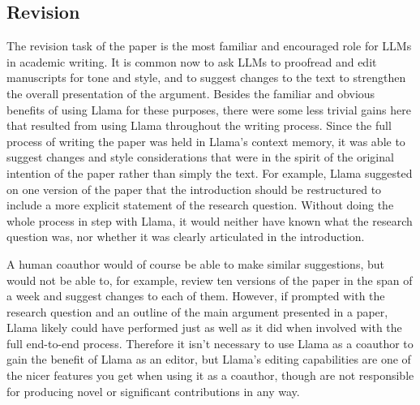 \subsection{Revision}

The revision task of the paper is the most familiar and encouraged role for
LLMs in academic writing. It is common now to ask LLMs to proofread and edit
manuscripts for tone and style, and to suggest changes to the text to strengthen
the overall presentation of the argument. Besides the familiar and obvious
benefits of using Llama for these purposes, there were some less trivial gains
here that resulted from using Llama throughout the writing process. Since
the full process of writing the paper was held in Llama's context memory, it was
able to suggest changes and style considerations that were in the spirit of the
original intention of the paper rather than simply the text. For example, Llama 
suggested on one version of the paper that the introduction should be
restructured to include a more explicit statement of the research question.
Without doing the whole process in step with Llama, it would neither have known
what the research question was, nor whether it was clearly articulated in the
introduction.

A human coauthor would of course be able to make similar suggestions, but would
not be able to, for example, review ten versions of the paper in the span of a
week and suggest changes to each of them. However, if prompted with the research
question and an outline of the main argument presented in a paper, Llama likely
could have performed just as well as it did when involved with the full
end-to-end process. Therefore it isn't necessary to use Llama as a coauthor to 
gain the benefit of Llama as an editor, but Llama's editing capabilities are
one of the nicer features you get when using it as a coauthor, though are not 
responsible for producing novel or significant contributions in any way.
